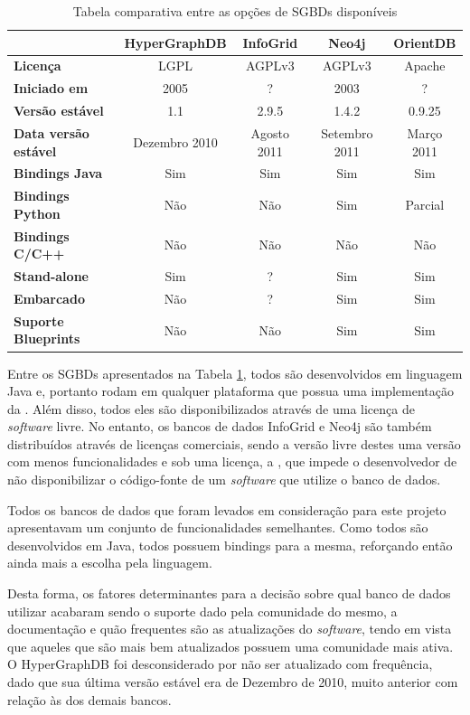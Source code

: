 \begin{table}[!htb]
	\centering
	\caption{Tabela comparativa entre as opções de SGBDs disponíveis}
	\label{tab:bancos}
	\begin{tabular}{lcccc}
		\hline
		& \textbf{HyperGraphDB} & \textbf{InfoGrid} & \textbf{Neo4j} & \textbf{OrientDB} \\
		\hline
		\textbf{Licença} & LGPL & AGPLv3 & AGPLv3 & Apache \\
		\textbf{Iniciado em} & 2005 & ? & 2003 & ? \\
		\textbf{Versão estável} & 1.1 & 2.9.5 & 1.4.2 & 0.9.25 \\
		\textbf{Data versão estável} & Dezembro 2010 & Agosto 2011 & Setembro 2011 & Março 2011 \\
		\textbf{Bindings Java} & Sim & Sim & Sim & Sim \\
		\textbf{Bindings Python} & Não & Não & Sim & Parcial \\
		\textbf{Bindings C/C++} & Não & Não & Não & Não \\
		\textbf{Stand-alone} & Sim & ? & Sim & Sim \\
		\textbf{Embarcado} & Não & ? & Sim & Sim \\
		\textbf{Suporte Blueprints} & Não & Não & Sim & Sim \\
		\hline
	\end{tabular}
\end{table}

Entre os SGBDs apresentados na Tabela \ref{tab:bancos}, todos são desenvolvidos em linguagem Java e, portanto rodam em qualquer plataforma que possua uma implementação da .
Além disso, todos eles são disponibilizados através de uma licença de \emph{software} livre.
No entanto, os bancos de dados InfoGrid e Neo4j são também distribuídos através de licenças comerciais, sendo a versão livre destes uma versão com menos funcionalidades e sob uma licença, a , que impede o desenvolvedor de não disponibilizar o código-fonte de um \emph{software} que utilize o banco de dados. %

Todos os bancos de dados que foram levados em consideração para este projeto apresentavam um conjunto de funcionalidades semelhantes.
Como todos são desenvolvidos em Java, todos possuem bindings para a mesma, reforçando então ainda mais a escolha pela linguagem.

Desta forma, os fatores determinantes para a decisão sobre qual banco de dados utilizar acabaram sendo o suporte dado pela comunidade do mesmo, a documentação e quão frequentes são as atualizações do \emph{software}, tendo em vista que aqueles que são mais bem atualizados possuem uma comunidade mais ativa.
O HyperGraphDB foi desconsiderado por não ser atualizado com frequência, dado que sua última versão estável era de Dezembro de 2010, muito anterior com relação às dos demais bancos.

